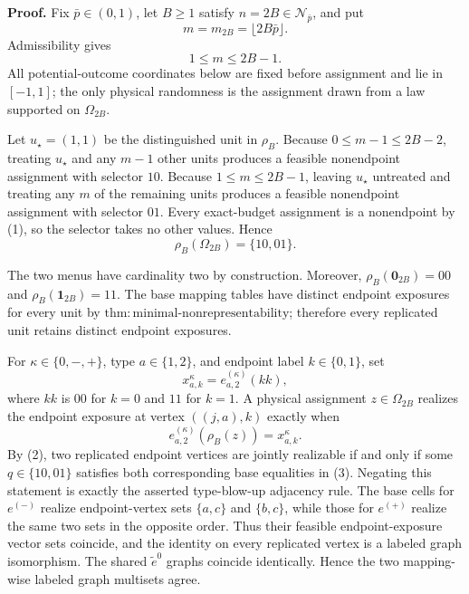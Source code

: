 \textbf{Proof.}
Fix \(\bar p\in(0,1)\), let \(B\ge1\) satisfy \(n=2B\in\mathcal N_{\bar p}\), and put
\[
 m=m_{2B}=\lfloor2B\bar p\rfloor.
\]
Admissibility gives
\[
 1\le m\le2B-1. \tag{1}
\]
All potential-outcome coordinates below are fixed before assignment and lie in \([-1,1]\); the only physical randomness is the assignment drawn from a law supported on \(\Omega_{2B}\).

Let \(u_\star=(1,1)\) be the distinguished unit in \(\rho_B\).  Because \(0\le m-1\le2B-2\), treating \(u_\star\) and any \(m-1\) other units produces a feasible nonendpoint assignment with selector \(10\).  Because \(1\le m\le2B-1\), leaving \(u_\star\) untreated and treating any \(m\) of the remaining units produces a feasible nonendpoint assignment with selector \(01\).  Every exact-budget assignment is a nonendpoint by (1), so the selector takes no other values.  Hence
\[
 \rho_B(\Omega_{2B})=\{10,01\}. \tag{2}
\]

The two menus have cardinality two by construction.  Moreover,
\(\rho_B(\mathbf 0_{2B})=00\) and \(\rho_B(\mathbf 1_{2B})=11\).  The base mapping tables have distinct endpoint exposures for every unit by \(\mathrm{thm{:}minimal\text{-}nonrepresentability}\); therefore every replicated unit retains distinct endpoint exposures.

For \(\kappa\in\{0,-,+\}\), type \(a\in\{1,2\}\), and endpoint label \(k\in\{0,1\}\), set
\[
 x^\kappa_{a,k}=e^{(\kappa)}_{a,2}(kk),
\]
where \(kk\) is \(00\) for \(k=0\) and \(11\) for \(k=1\).  A physical assignment \(z\in\Omega_{2B}\) realizes the endpoint exposure at vertex \(((j,a),k)\) exactly when
\[
 e^{(\kappa)}_{a,2}(\rho_B(z))=x^\kappa_{a,k}. \tag{3}
\]
By (2), two replicated endpoint vertices are jointly realizable if and only if some \(q\in\{10,01\}\) satisfies both corresponding base equalities in (3).  Negating this statement is exactly the asserted type-blow-up adjacency rule.  The base cells for \(e^{(-)}\) realize endpoint-vertex sets \(\{a,c\}\) and \(\{b,c\}\), while those for \(e^{(+)}\) realize the same two sets in the opposite order.  Thus their feasible endpoint-exposure vector sets coincide, and the identity on every replicated vertex is a labeled graph isomorphism.  The shared \(\widetilde e^0\) graphs coincide identically.  Hence the two mapping-wise labeled graph multisets agree.

